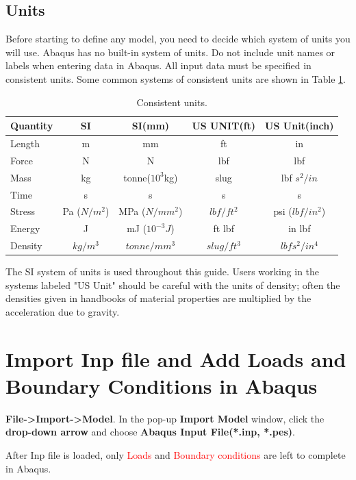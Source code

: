 \documentclass[10pt,a4paper]{article}
\begin{document}
\subsection{Units}
Before starting to define any model, you need to decide which system of units you will use. Abaqus has no built-in system of units. Do not include unit names or labels when entering data in Abaqus. All input data must be specified in consistent units. Some common systems of consistent units are shown in Table \ref{Table: Consistent units.}.

\begin{table}[htb]
\caption{Consistent units.}
\label{Table: Consistent units.}
\begin{tabular}{|p{3cm}|c|c|c|c|}
\hline
\textbf{Quantity} & \textbf{SI} & \textbf{SI(mm)} & \textbf{US UNIT(ft)} & \textbf{US Unit(inch)} \\
\hline
Length & m & mm & ft & in \\
Force & N & N & lbf & lbf \\
Mass & kg & tonne($ 10^3 $kg) & slug & lbf $ s^2/in $ \\
Time & s & s & s & s \\
Stress & Pa ($ N/m^2 $) & MPa ($ N/mm^2 $) & $ lbf/ft^2 $ & psi ($ lbf/in^2 $) \\
Energy & J & mJ ($ 10^{-3} J $) & ft lbf & in lbf \\
Density & $ kg/m^3 $ & $ tonne/mm^3 $ & $ slug/ft^3 $ & $ lbf s^2/in^4 $ \\
\hline
\end{tabular}
\end{table}

The SI system of units is used throughout this guide. Users working in the systems labeled "US Unit" should be careful with the units of density; often the densities given in handbooks of material properties are multiplied by the acceleration due to gravity.

\section{Import Inp file and Add Loads and Boundary Conditions in Abaqus}
\textbf{File-\textgreater Import-\textgreater Model}. In the pop-up \textbf{Import Model} window, click the \textbf{drop-down arrow} and choose \textbf{Abaqus Input File(*.inp, *.pes)}.

After Inp file is loaded, only \textcolor{red}{Loads} and \textcolor{red}{Boundary conditions} are left to complete in Abaqus. 
\end{document}
